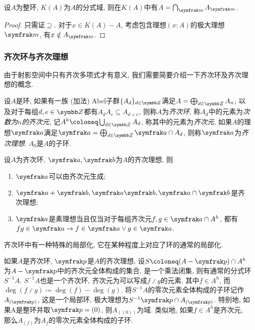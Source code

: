 \begin{proposition}\label{prop:integraldomainlocalizationintersection}
  设$A$为整环, $K(A)$为$A$的分式域, 则在$K(A)$中有$A=\bigcap_{\ideal{m}}A_{\ideal{m}}$.
\end{proposition}

\begin{proof}
  只需证$\supseteq$. 对于$x\in K(A)-A$, 考虑包含理想$(x\colon A)$的极大理想$\ideal{m}$, 有$x\notin A_{\ideal{m}}$.
\end{proof}

\subsubsection{齐次环与齐次理想}

由于射影空间中只有齐次多项式才有意义, 我们需要简要介绍一下齐次环及齐次理想的概念.

\begin{definition}
  设$A$是环, 如果有一族 (加法) Abel子群$\{A_d\}_{d\in \ZZ}$满足$A=\bigoplus_{d\in\ZZ}A_n$, 以及对于每组$d, e\in \ZZ$都有$A_dA_e\subseteq A_{d+e}$, 则称$A$为\emph{齐次环}, 称$A_d$中的元素为\emph{次数为$n$的齐次元}, 记$A^h\coloneq\bigcup_{d\in\ZZ}A_d$, 称其中的元素为\emph{齐次元}. 如果$A$的理想$\ideal{a}$满足$\ideal{a}=\bigoplus_{d\in \ZZ}\ideal{a}\cap A_d$, 则称$\ideal{a}$为\emph{齐次理想}. $A_0$是$A$的子环.
\end{definition}

\begin{proposition}
  设$A$为齐次环, $\ideal{a}, \ideal{b}$为$A$的齐次理想, 则
  \begin{enumerate}
    \item $\ideal{a}$可以由齐次元生成;
    \item $\ideal{a}+\ideal{b}, \ideal{a}\ideal{b}, \ideal{a}\cap\ideal{b}$是齐次理想;
    \item $\ideal{a}$是素理想当且仅当对于每组齐次元$f, g\in\ideal{a}\cap A^h$, 都有$fg\in \ideal{a}\rightarrow f\in\ideal{a}\vee g\in\ideal{a}$.
  \end{enumerate}
\end{proposition}

齐次环中有一种特殊的局部化, 它在某种程度上对应了环的通常的局部化.

\begin{definition}
  如果$A$是齐次环, $\ideal{p}$是$A$的齐次理想, 设$S\coloneq (A-\ideal{p})\cap A^h$为$A-\ideal{p}$中的齐次元全体构成的集合, 是一个乘法闭集, 则有通常的分式环$S^{-1}A$. $S^{-1}A$也是一个齐次环, 齐次元为可以写成$f{\divslash}g$的元素, 其中$f\in A^h$, 而$\deg (f{\divslash}g)\coloneq \deg (f)-\deg (g)$. 将$S^{-1}A$的零次元素全体构成的子环记作$A_{(\ideal{p})}$, 这是一个局部环, 极大理想为$S^{-1}\ideal{p}\cap A_{(\ideal{p})}$. 特别地, 如果A是整环并取$\ideal{p}=(0)$, 则$A_{((0))}$为域. 类似地, 如果$f\in A^h$是齐次元, 那么$A_{(f)}$为$A_f$的零次元素全体构成的子环.
\end{definition}

